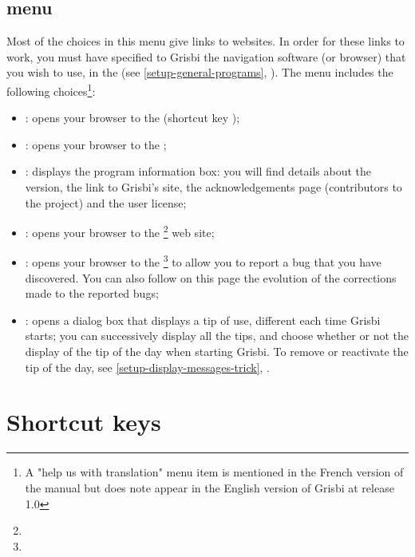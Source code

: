 \subsection{ menu\label{home-menus-help}}

Most of the choices in this menu give links to websites. In order for these links to work, you must have specified to Grisbi the navigation software (or browser) that you wish to use, in the  (see \vref{setup-general-programs}, ). The  menu includes the following choices\footnote{ A "help us with translation" menu item is mentioned in the French version of the manual but does note appear in the English version of Grisbi at release 1.0}:

\begin{itemize}
	\item {}: opens your browser to the   (shortcut key  );
	\item {}: opens your browser to the  ;
	\item {}: displays the program information box: you will find details about the version, the link to Grisbi's site, the acknowledgements page (contributors to the project) and the user license;
	\item {}: opens your browser to the \footnote{\urlGrisbi{}} web site;
	\item {}: opens your browser to the \footnote{\urlBugTracker{}} to allow you to report a bug that you have discovered. You can also follow on this page the evolution of the corrections made to the reported bugs;
	\item {}: opens a dialog box that displays a tip of use, different each time Grisbi starts; you can successively display all the tips, and choose whether or not the display of the tip of the day when starting Grisbi. To remove or reactivate the tip of the day, see \vref{setup-display-messages-trick}, .
\end{itemize}


\section{Shortcut keys\label{home-shortcuts}}


